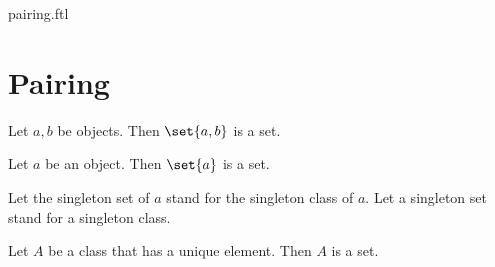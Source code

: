 \documentclass{naproche-library}
\begin{document}
\begin{smodule}{pairing.ftl}

  \section{Pairing}

  \begin{axiom}[forthel,title=Pairing Axiom,id=FOUNDATIONS_10_7376893816864768]
    Let $a, b$ be objects.
    Then $\set{a, b}$ is a set.
  \end{axiom}
  
  \begin{proposition}[forthel,id=FOUNDATIONS_10_7556516257202176]
    Let $a$ be an object.
    Then $\set{a}$ is a set.
  \end{proposition}

  \begin{forthel}
    Let the singleton set of $a$ stand for the singleton class of $a$.
    Let a singleton set stand for a singleton class.
  \end{forthel}
  
  \begin{corollary}[forthel,id=FOUNDATIONS_10_8408517115379712]
    Let $A$ be a class that has a unique element.
    Then $A$ is a set.
  \end{corollary}
\end{smodule}
\end{document}
